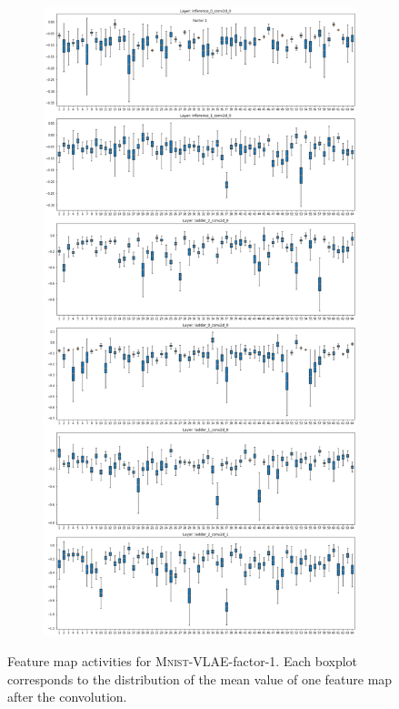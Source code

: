 \begin{figure}[H]
    \centering
    \begin{subfigure}{\textwidth}
        \centering
        \includegraphics[height=.8\textheight]{images/sparseness/encoder_fm1_fms.png}
    \end{subfigure}
    \caption[\textsc{Mnist}-VLAE-factor-1: Feature Map Activites]{Feature map activities for \textsc{Mnist}-\ac{VLAE}-factor-1.
    Each boxplot corresponds to the distribution of the mean value of one feature map after the convolution.
    }
\end{figure}


